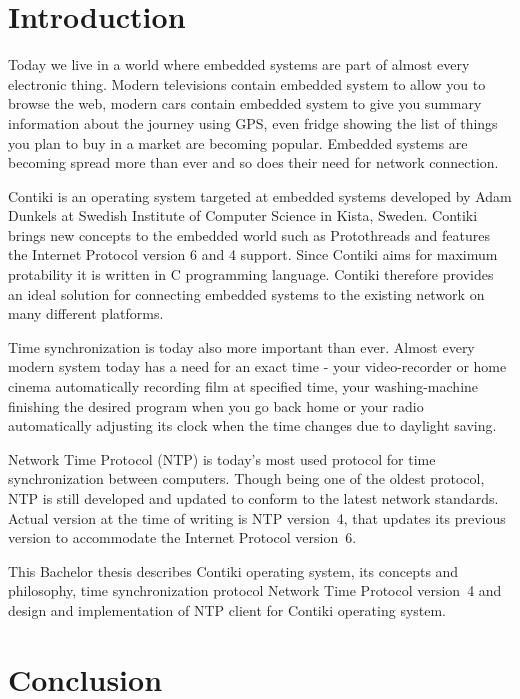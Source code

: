 
\chapter{Introduction}
Today we live in a world where embedded systems are part of almost every electronic thing. Modern televisions
contain embedded system to allow you to browse the web, modern cars contain embedded system to give you summary information
about the journey using GPS, even fridge showing the list of things you plan to buy in a market are becoming popular.
Embedded systems are becoming spread more than ever and so does
their need for network connection.

Contiki is an operating system targeted at embedded systems
developed by Adam Dunkels at Swedish Institute of Computer Science in Kista, Sweden.
Contiki brings new concepts to the embedded world such as Protothreads and features
the Internet Protocol version 6 and 4 support.
Since Contiki aims for maximum protability it is written in C programming language.
Contiki therefore provides an ideal solution for connecting
embedded systems to the existing network on many different platforms.

Time synchronization is today also more important than ever. Almost every modern system today has a need for an exact time -
your video-recorder or home cinema automatically recording film at specified time, your washing-machine finishing the
desired program when you go back home or your radio automatically adjusting its clock when the time changes
due to daylight saving.

Network Time Protocol (NTP) is today's most used protocol for time synchronization between computers.
Though being one of the oldest protocol, NTP is still developed and updated to conform to the latest
network standards. Actual version at the time of writing is NTP version~4, that updates its previous version to
accommodate the Internet Protocol version~6.

This Bachelor thesis describes Contiki operating system, its concepts and philosophy, time synchronization protocol
Network Time Protocol version~4 and design and implementation of NTP client for Contiki operating system.








\chapter{Conclusion}
